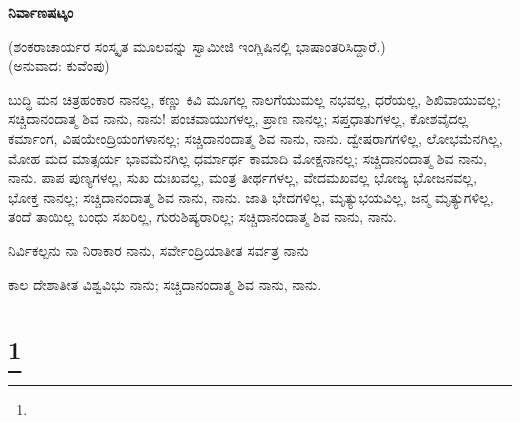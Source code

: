 \begin{myquote}
\end{myquote}

\begin{myquote}
\end{myquote}

\selectkan

\begin{center}
\textbf{ನಿರ್ವಾಣಷಟ್ಕಂ}
\end{center}

\begin{center}
(ಶಂಕರಾಚಾರ್ಯರ ಸಂಸ್ಕೃತ ಮೂಲವನ್ನು ಸ್ವಾಮೀಜಿ ಇಂಗ್ಲಿಷಿನಲ್ಲಿ ಭಾಷಾಂತರಿಸಿದ್ದಾರೆ.)\\(ಅನುವಾದ: ಕುವೆಂಪು)
\end{center}

ಬುದ್ಧಿ ಮನ ಚಿತ್ರಹಂಕಾರ ನಾನಲ್ಲ, ಕಣ್ಣು ಕಿವಿ ಮೂಗಲ್ಲ ನಾಲಗೆಯುಮಲ್ಲ ನಭವಲ್ಲ, ಧರೆಯಲ್ಲ, ಶಿಖಿವಾಯುವಲ್ಲ; ಸಚ್ಚಿದಾನಂದಾತ್ಮ ಶಿವ ನಾನು, ನಾನು! ಪಂಚವಾಯುಗಳಲ್ಲ, ಪ್ರಾಣ ನಾನಲ್ಲ; ಸಪ್ತಧಾತುಗಳಲ್ಲ, ಕೋಶವೈದಲ್ಲ ಕರ್ಮಾಂಗ, ವಿಷಯೇಂದ್ರಿಯಂಗಳಾನಲ್ಲ; ಸಚ್ಚಿದಾನಂದಾತ್ಮ ಶಿವ ನಾನು, ನಾನು. ದ್ವೇಷರಾಗಗಳಿಲ್ಲ, ಲೋಭಮೆನಗಿಲ್ಲ, ಮೋಹ ಮದ ಮಾತ್ಸರ್ಯ ಭಾವಮೆನಗಿಲ್ಲ ಧರ್ಮಾರ್ಥ ಕಾಮಾದಿ ಮೋಕ್ಷನಾನಲ್ಲ; ಸಚ್ಚಿದಾನಂದಾತ್ಮ ಶಿವ ನಾನು, ನಾನು. ಪಾಪ ಪುಣ್ಯಗಳಲ್ಲ, ಸುಖ ದುಃಖವಲ್ಲ, ಮಂತ್ರ ತೀರ್ಥಗಳಲ್ಲ, ವೇದಮಖವಲ್ಲ ಭೋಜ್ಯ ಭೋಜನವಲ್ಲ, ಭೋಕ್ತ ನಾನಲ್ಲ; ಸಚ್ಚಿದಾನಂದಾತ್ಮ ಶಿವ ನಾನು, ನಾನು. ಜಾತಿ ಭೇದಗಳಿಲ್ಲ, ಮೃತ್ಯುಭಯವಿಲ್ಲ, ಜನ್ಮ ಮೃತ್ಯುಗಳಿಲ್ಲ, ತಂದೆ ತಾಯಿಲ್ಲ ಬಂಧು ಸಖರಿಲ್ಲ, ಗುರುಶಿಷ್ಯರಾರಿಲ್ಲ; ಸಚ್ಚಿದಾನಂದಾತ್ಮ ಶಿವ ನಾನು, ನಾನು.

ನಿರ್ವಿಕಲ್ಪನು ನಾ ನಿರಾಕಾರ ನಾನು, ಸರ್ವೇಂದ್ರಿಯಾತೀತ ಸರ್ವತ್ರ ನಾನು

ಕಾಲ ದೇಶಾತೀತ ವಿಶ್ವವಿಭು ನಾನು; ಸಚ್ಚಿದಾನಂದಾತ್ಮ ಶಿವ ನಾನು, ನಾನು.

\selecteng

\chapter[THE HYMN OF CREATION]{\protect\footnote{}}

